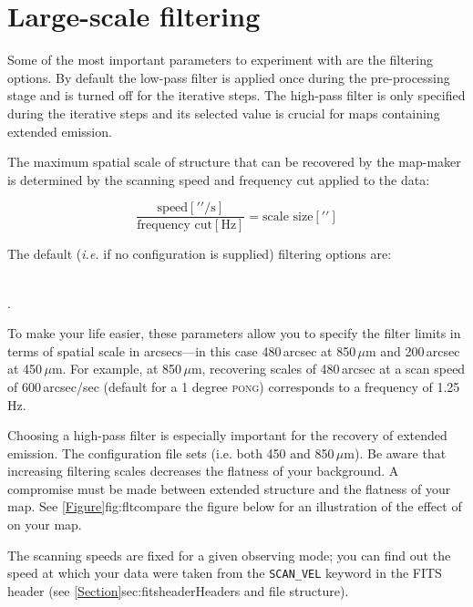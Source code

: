 \section{Large-scale filtering}
\label{sec:filt}

Some of the most important parameters to experiment with are the
filtering options. By default the low-pass filter is applied once
during the pre-processing stage and is turned off for the iterative
steps. The high-pass filter is only specified during the iterative
steps and its selected value is crucial for maps containing extended
emission.

The maximum spatial scale of structure that can be recovered by the
map-maker is determined by the scanning speed and frequency cut
applied to the data:

\begin{equation}
\frac{\textrm{speed}[\prime\prime / \textrm{s}]}{\textrm{frequency
    cut}[\textrm{Hz}]}=\textrm{scale size}[\prime\prime]
\end{equation}

The default (\emph{i.e.} if no configuration is supplied) filtering options are:

 \\
.

To make your life easier, these parameters allow you to specify the
filter limits in terms of spatial scale in arcsecs---in this case
480\,arcsec at 850\,$\mu$m and 200\,arcsec at 450\,$\mu$m. For example,
at 850\,$\mu$m, recovering scales of 480\,arcsec at a scan speed of
600\,arcsec/sec (default for a 1 degree \textsc{pong}) corresponds to
a frequency of 1.25\,Hz.

Choosing a high-pass filter is especially important for the recovery
of extended emission. The 
configuration file sets 
(i.e. both 450 and 850\,$\mu$m). Be aware that increasing filtering scales
decreases the flatness of your background. A compromise must be made between
extended structure and the flatness of your map. See \cref{Figure}{fig:fltcompare}
{the figure below} for an illustration of the effect of
 on your map.

The scanning speeds are fixed for a given observing mode; you can find
out the speed at which your data were taken from the
\texttt{SCAN\_VEL} keyword in the FITS header (see
\cref{Section}{sec:fitsheader}{Headers and file structure}).

